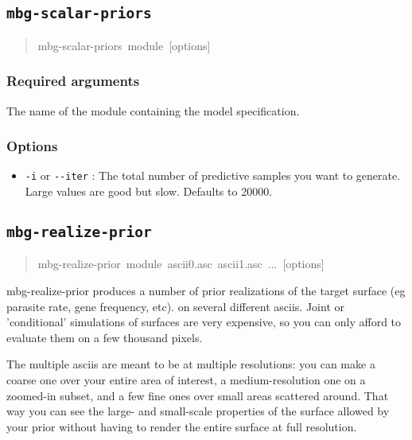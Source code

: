 \subsection{\texttt{mbg-scalar-priors}%
}
%
\begin{quote}{\ttfamily \raggedright \noindent
mbg-scalar-priors~module~{[}options{]}
}
\end{quote}




\subsubsection{Required arguments%
}
\setcounter{listcnt0}{0}
\begin{list}{.}
{
\setlength{\rightmargin}{\leftmargin}
}

\item The name of the module containing the model specification.
\end{list}




\subsubsection{Options%
}
%
\begin{itemize}

\item \texttt{-i} or \texttt{-{}-iter} : The total number of predictive samples you want to generate. Large
values are good but slow. Defaults to 20000.

\end{itemize}




\subsection{\texttt{mbg-realize-prior}%
}
%
\begin{quote}{\ttfamily \raggedright \noindent
mbg-realize-prior~module~ascii0.asc~ascii1.asc~...~{[}options{]}
}
\end{quote}

mbg-realize-prior produces a number of prior realizations of the target surface (eg parasite
rate, gene frequency, etc). on several different asciis. Joint or 'conditional' simulations
of surfaces are very expensive, so you can only afford to evaluate them on a few thousand
pixels.

The multiple asciis are meant to be at multiple resolutions: you can make a coarse one over
your entire area of interest, a medium-resolution one on a zoomed-in subset, and a few fine
ones over small areas scattered around. That way you can see the large- and small-scale
properties of the surface allowed by your prior without having to render the entire surface
at full resolution.


